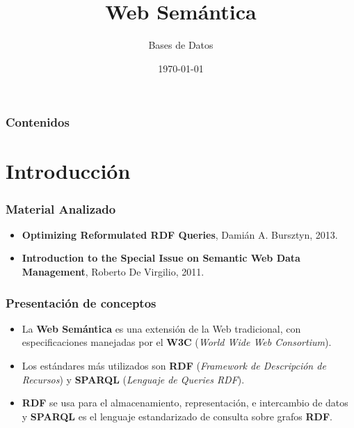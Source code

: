 \documentclass{beamer}
\title[Presentación del TP2]{Web Semántica} %
\author{Bases de Datos} %
\institute[] %
{
Federico Allocati, Sabrina Izcovich, Santiago Pernigotti, Germán Romano\\ %
\medskip
}
\date{\today} %
\begin{document}
\begin{frame}
\titlepage %
\end{frame}

\begin{frame}
\frametitle{Contenidos} %
\tableofcontents %
\end{frame}


\section{Introducción} 
\begin{frame}
\frametitle{Material Analizado}
\begin{itemize}
\item \textbf{Optimizing Reformulated RDF Queries}, Damián A. Bursztyn, 2013.

\item \textbf{Introduction to the Special Issue on Semantic Web Data Management}, Roberto De Virgilio, 2011.
\end{itemize}
\end{frame}


\begin{frame}
\frametitle{Presentación de conceptos}
\begin{itemize}
\item La \textbf{Web Semántica} es una extensión de la Web tradicional, con especificaciones manejadas por el \textbf{W3C} (\textit{World Wide Web Consortium}).

\item Los estándares más utilizados son \textbf{RDF} (\textit{Framework de Descripción de Recursos}) y \textbf{SPARQL} (\textit{Lenguaje de Queries RDF}).

\item \textbf{RDF} se usa para el almacenamiento, representación, e intercambio de datos y \textbf{SPARQL} es el lenguaje estandarizado de consulta sobre grafos \textbf{RDF}.
\end{itemize}
\end{frame}
\end{document}
